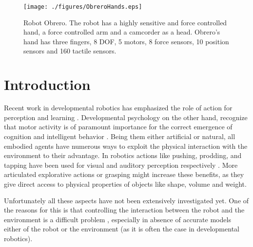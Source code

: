 \begin{figure}[tbp]
\centerline{
\texttt{[image: ./figures/ObreroHands.eps]}
} \caption{Robot Obrero. The robot has a highly sensitive and
force controlled hand, a force controlled arm and a
camcorder as a head. Obrero's hand  has three fingers, 8 DOF, 5
motors, 8 force sensors, 10 position sensors and 160 tactile
sensors.} \label{fig:RobotObrero}
\end{figure}

\section{Introduction}

Recent work in developmental robotics has emphasized the role of
action for perception and learning 
\cite{metta03early,natale04learning,natale05from}. Developmental
psychology on the other hand, recognize that motor activity is of
paramount importance for the correct emergence of cognition and
intelligent behavior \cite{streri93Seeing,bushnell93motor}. 
Being them either artificial or natural, all embodied agents have 
numerous ways to exploit the physical interaction with the environment 
to their advantage. In robotics actions like pushing, prodding, 
and tapping have been used for visual and auditory perception 
respectively \cite{metta03early,etorresjara05tapping}. More articulated 
explorative actions or grasping might increase these benefits, as they give
direct access to physical properties of objects like shape, volume
and weight.


Unfortunately all these aspects have not been extensively investigated yet. One
of the reasons for this is that controlling the interaction between the robot and
the environment is a difficult problem \cite{volpe90real}, especially in absence of accurate
models either of the robot or the environment (as it is often the case in
developmental robotics). %

